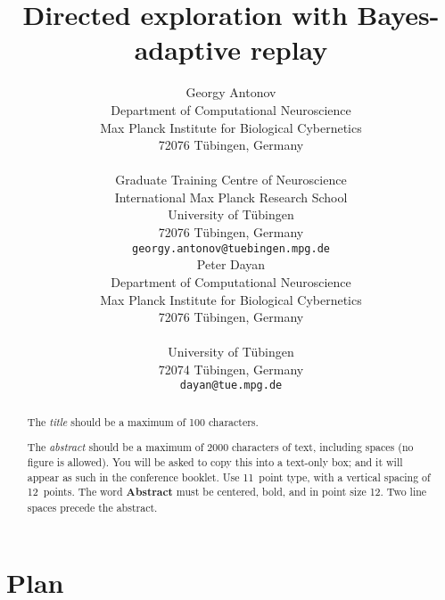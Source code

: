\documentclass[11pt]{article} %
\title{Directed exploration with Bayes-adaptive replay}
\author{
Georgy Antonov\\
Department of Computational Neuroscience\\
Max Planck Institute for Biological Cybernetics\\
72076 T\"{u}bingen, Germany\\
\\
Graduate Training Centre of Neuroscience\\
International Max Planck Research School\\
University of T\"{u}bingen\\
72076 T\"{u}bingen, Germany\\
\texttt{georgy.antonov@tuebingen.mpg.de} \\
\And
Peter Dayan \\
Department of Computational Neuroscience\\
Max Planck Institute for Biological Cybernetics\\
72076 T\"{u}bingen, Germany\\
\\
University of T\"{u}bingen\\
72074 T\"{u}bingen, Germany\\
\texttt{dayan@tue.mpg.de} \\
}
\begin{document}
\maketitle

\begin{abstract}
The \emph{title} should be a maximum of 100 characters. 

The \emph{abstract} should be a maximum of 2000 characters of text,
including spaces (no figure is allowed). You will be asked to copy
this into a text-only box; and it will appear as such in the
conference booklet. Use 11~point type, with a vertical spacing of
12~points.  The word \textbf{Abstract} must be centered, bold, and in
point size 12. Two line spaces precede the abstract.
\end{abstract}




\startmain %

\section{Plan}
\end{document}

